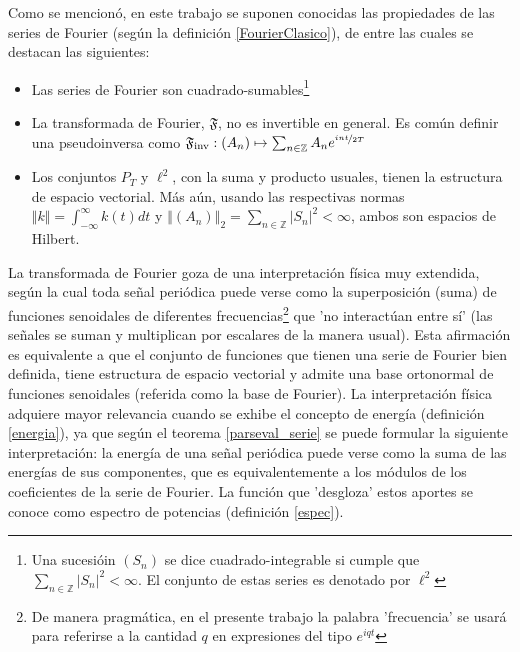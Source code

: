 \documentclass[12pt,a4paper]{mitthesis}
\newcommand{\intR}{\int_{-\infty}^{\infty}}
\newcommand{\abso}[1]{\left| #1 \right|}
\begin{document}
Como se mencion\'o, en este trabajo se suponen conocidas las propiedades de las series de Fourier 
(seg\'un la definici\'on \ref{FourierClasico}), de entre las cuales se destacan las siguientes:
\begin{itemize}
\item Las series de Fourier  son cuadrado-sumables\footnote{Una sucesi\'oin $\left( S_n \right)$ se 
dice cuadrado-integrable si cumple que $\sum_{n\in \mathbb{Z}} \abso{S_n}^{2} < \infty$. El 
conjunto de estas series es denotado por $\ell^{2}$}

\item La transformada de Fourier, $\mathfrak{F}$, no es invertible en general. Es com\'un definir
una pseudoinversa como 
$\mathfrak{F}_{\text{inv}} 
: \left( A_n \right) \mapsto \sum_{n \in \mathbb{Z}} A_n e^{\nicefrac{i n t}{2 T}} $

\item Los conjuntos $P_T$ y $\ell^{2}$, con la suma y producto usuales, tienen la estructura de 
espacio vectorial. M\'as a\'un, usando las respectivas normas $\Vert k \Vert = \intR k(t) dt$ y 
$\left\Vert \left( A_n \right) \right\Vert_2 = \sum_{n\in \mathbb{Z}} \abso{S_n}^{2} < \infty$,
ambos son espacios de Hilbert.
\end{itemize}

La transformada de Fourier goza de una interpretación física muy extendida, seg\'un la cual toda 
se\~nal peri\'odica puede verse como la superposici\'on (suma) de funciones senoidales de 
diferentes frecuencias\footnote{De manera pragm\'atica, en el presente trabajo la palabra 
'frecuencia' se usar\'a para referirse a la cantidad $q$ en expresiones del tipo $e^{i q t}$} que 
'no interact\'uan entre s\'i' (las se\~nales se suman y multiplican por escalares de la manera 
usual). 
Esta afirmaci\'on es equivalente a que el conjunto de funciones que tienen una serie de Fourier 
bien definida, tiene estructura de espacio vectorial y admite una base ortonormal de funciones 
senoidales (referida como la base de Fourier). 
La interpretaci\'on f\'isica adquiere mayor relevancia cuando se exhibe el concepto de energ\'ia
(definici\'on \ref{energia}), ya que seg\'un el teorema \ref{parseval_serie} se puede formular la 
siguiente interpretaci\'on: la energ\'ia de una se\~nal peri\'odica puede verse como la suma de las 
energ\'ias de sus componentes, que es equivalentemente a los m\'odulos de los coeficientes de la 
serie de Fourier.
La funci\'on que 'desgloza' estos aportes se conoce como espectro de potencias (definici\'on 
\ref{espec}).
\end{document}
